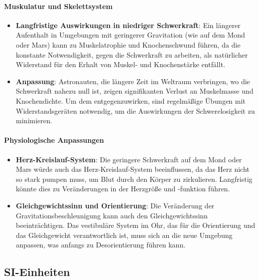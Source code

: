 \documentclass{vorlage-design-main}
\begin{document}
\hypertarget{muskulatur-und-skelettsystem}{%
\paragraph{Muskulatur und
Skelettsystem}\label{muskulatur-und-skelettsystem}}

\begin{itemize}

\item
  \textbf{Langfristige Auswirkungen in niedriger Schwerkraft}: Ein
  längerer Aufenthalt in Umgebungen mit geringerer Gravitation (wie auf
  dem Mond oder Mars) kann zu Muskelatrophie und Knochenschwund führen,
  da die konstante Notwendigkeit, gegen die Schwerkraft zu arbeiten, als
  natürlicher Widerstand für den Erhalt von Muskel- und Knochenstärke
  entfällt.
\item
  \textbf{Anpassung}: Astronauten, die längere Zeit im Weltraum
  verbringen, wo die Schwerkraft nahezu null ist, zeigen signifikanten
  Verlust an Muskelmasse und Knochendichte. Um dem entgegenzuwirken,
  sind regelmäßige Übungen mit Widerstandsgeräten notwendig, um die
  Auswirkungen der Schwerelosigkeit zu minimieren.
\end{itemize}

\hypertarget{physiologische-anpassungen}{%
\paragraph{Physiologische
Anpassungen}\label{physiologische-anpassungen}}

\begin{itemize}

\item
  \textbf{Herz-Kreislauf-System}: Die geringere Schwerkraft auf dem Mond
  oder Mars würde auch das Herz-Kreislauf-System beeinflussen, da das
  Herz nicht so stark pumpen muss, um Blut durch den Körper zu
  zirkulieren. Langfristig könnte dies zu Veränderungen in der Herzgröße
  und -funktion führen.
\item
  \textbf{Gleichgewichtssinn und Orientierung}: Die Veränderung der
  Gravitationsbeschleunigung kann auch den Gleichgewichtssinn
  beeinträchtigen. Das vestibuläre System im Ohr, das für die
  Orientierung und das Gleichgewicht verantwortlich ist, muss sich an
  die neue Umgebung anpassen, was anfangs zu Desorientierung führen
  kann.
\end{itemize}

\hypertarget{si-einheiten}{%
\subsection{SI-Einheiten}\label{si-einheiten}}
\end{document}
